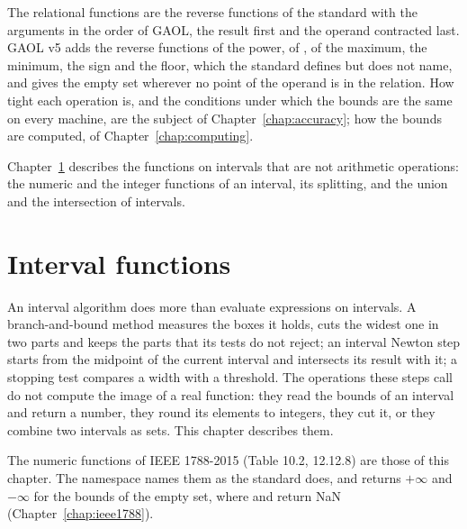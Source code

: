 \documentclass[12pt,a4paper,twoside,openright]{book}
\begin{document}
\medskip
The relational functions are the reverse functions of the standard with the
arguments in the order of GAOL, the result first and the operand contracted
last. GAOL v5 adds the reverse functions of the power, of , of
the maximum, the minimum, the sign and the floor, which the standard defines
but does not name, and gives the empty set wherever no point of the operand
is in the relation.\newinvfive{} How tight each operation is, and the
conditions under which the bounds are the same on every machine, are the
subject of Chapter~\ref{chap:accuracy}; how the bounds are computed, of
Chapter~\ref{chap:computing}.

\medskip
Chapter~\ref{chap:functions} describes the functions on intervals that are
not arithmetic operations: the numeric and the integer functions of an
interval, its splitting, and the union and the intersection of intervals.

\chapter{Interval functions}\label{chap:functions}

An interval algorithm does more than evaluate expressions on intervals. A
branch-and-bound method measures the boxes it holds, cuts the widest one in
two parts and keeps the parts that its tests do not reject; an interval
Newton step starts from the midpoint of the current interval and intersects
its result with it; a stopping test compares a width with a threshold. The
operations these steps call do not compute the image of a real function:
they read the bounds of an interval and return a number, they round its
elements to integers, they cut it, or they combine two intervals as sets.
This chapter describes them.

\medskip
The numeric functions of IEEE 1788-2015 (Table 10.2, 12.12.8) are those of
this chapter. The namespace  names them as the standard
does, and returns $+\infty$ and $-\infty$ for the bounds of the empty set,
where  and  return NaN
(Chapter~\ref{chap:ieee1788}).
\end{document}
